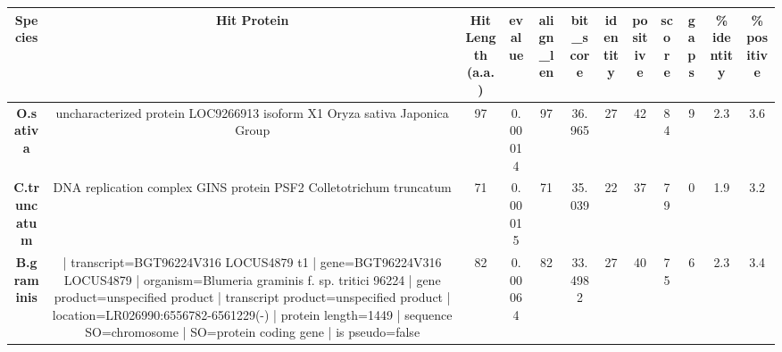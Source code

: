 \begin{tabular}{|c|c|c|c|c|c|c|c|c|c|c|c|} \hline
\textbf{Species} & \textbf{Hit Protein} & \textbf{Hit Length (a.a.)} & \textbf{evalue} & \textbf{align\_len} & \textbf{bit\_score} & \textbf{identity} & \textbf{positive} & \textbf{score} & \textbf{gaps} & \textbf{\% identity} & \textbf{\% positive} \\ \hline
\textbf{O.sativa} & uncharacterized protein LOC9266913 isoform X1 Oryza sativa Japonica Group & 97 & 0.00014 & 97 & 36.965 & 27 & 42 & 84 & 9 & 2.3 & 3.6\\
\textbf{C.truncatum} & DNA replication complex GINS protein PSF2 Colletotrichum truncatum & 71 & 0.00015 & 71 & 35.039 & 22 & 37 & 79 & 0 & 1.9 & 3.2\\
\textbf{B.graminis} & | transcript=BGT96224V316 LOCUS4879 t1 | gene=BGT96224V316 LOCUS4879 | organism=Blumeria graminis f. sp. tritici 96224 | gene product=unspecified product | transcript product=unspecified product | location=LR026990:6556782-6561229(-) | protein length=1449 | sequence SO=chromosome | SO=protein coding gene | is pseudo=false & 82 & 0.00064 & 82 & 33.4982 & 27 & 40 & 75 & 6 & 2.3 & 3.4\\
\hline \end{tabular}
